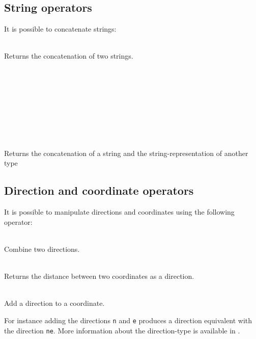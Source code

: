 \subsection{String operators}

It is possible to concatenate strings:
\begin{dlist}
  \item {} \\
    Returns the concatenation of two strings.
  \item {} \\
    \\
    \\
    \\
    \\
    \\
    \\
    \\
    Returns the concatenation of a string and the string-representation of another type
\end{dlist}

\subsection{Direction and coordinate operators}

It is possible to manipulate directions and coordinates using the following operator:
\begin{dlist}
  \item {} \\
    Combine two directions.
  \item {} \\
    Returns the distance between two coordinates as a direction.
  \item {} \\
    Add a direction to a coordinate.
\end{dlist}
For instance adding the directions \texttt{n} and \texttt{e} produces a direction
equivalent with the direction \texttt{ne}. More information about the direction-type
is available in .


